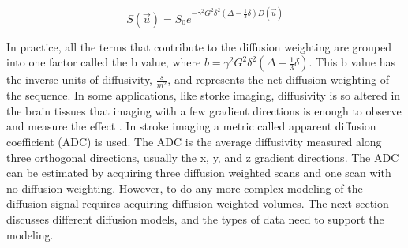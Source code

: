 \begin{equation}
\label{eqn:diffSignal}
S(\vec{u}) = S_0e^{-\gamma^2 G^2 \delta^2(\Delta - \frac{1}{3}\delta) D(\vec{u})}
\end{equation}

In practice, all the terms that contribute to the diffusion weighting are grouped into one factor called the b value, where $b = \gamma^2 G^2 \delta^2(\Delta - \frac{1}{3}\delta)$. This b value has the inverse units of diffusivity, $\frac{s}{m^2}$, and represents the net diffusion weighting of the sequence. In some applications, like storke imaging, diffusivity is so altered in the brain tissues that imaging with a few gradient directions is enough to observe and measure the effect \cite{Mukherjee_2000}. In stroke imaging a metric called apparent diffusion coefficient (ADC) is used. The ADC is the average diffusivity measured along three orthogonal directions, usually the x, y, and z gradient directions. The ADC can be estimated by acquiring three diffusion weighted scans and one scan with no diffusion weighting. However, to do any more complex modeling of the diffusion signal requires acquiring diffusion weighted volumes. The next section discusses different diffusion models, and the types of data need to support the modeling.
